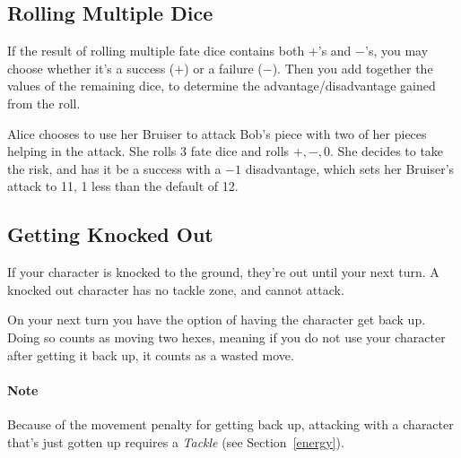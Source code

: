 \subsection{Rolling Multiple Dice}\label{sec:multidice} If the result of rolling multiple fate dice contains both $+$'s and $-$'s, you may choose whether it's a success ($+$) or a failure ($-$).
Then you add together the values of the remaining dice, to determine the advantage/disadvantage gained from the roll.

\example Alice chooses to use her Bruiser to attack Bob's piece with two of her pieces helping in the attack.
She rolls 3 fate dice and rolls $+, -, 0$. 
She decides to take the risk, and has it be a success with a $-1$ disadvantage, which sets her Bruiser's attack to 11, 1 less than the default of 12.

\subsection{Getting Knocked Out}\label{sec:knockout}
If your character is knocked to the ground, they're out until your next turn. A knocked out character has no tackle zone, and cannot attack.

On your next turn you have the option of having the character get back up. Doing so counts as moving two hexes, meaning if you do not use your character after getting it back up, it counts as a wasted move. 

\paragraph{Note} Because of the movement penalty for getting back up, attacking with a character that's just gotten up requires a \textit{Tackle} (see Section~\ref{energy}).